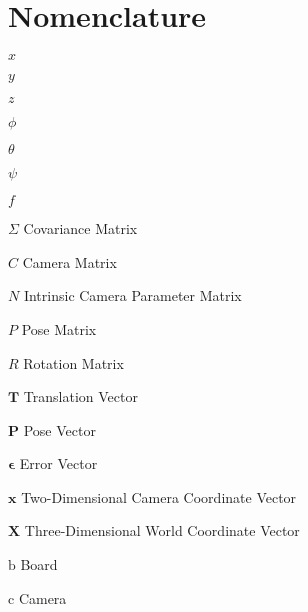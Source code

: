 \chapter{Nomenclature}

\begin{Nomencl}[2cm]

   \item[$x$]         
   \item[$y$]         
   \item[$z$]         
   \item[$\phi$]      
   \item[$\theta$]    
   \item[$\psi$]      \\
   \item[$f$]	      

   \item[$\Sigma$] 	Covariance Matrix
   \item[$C$]		Camera Matrix
   \item[$N$]		Intrinsic Camera Parameter Matrix
   \item[$P$]		Pose Matrix
   \item[$R$]		Rotation Matrix
   \item[$\bm{T}$]	Translation Vector
   \item[$\bm{P}$]	Pose Vector
   \item[$\bm{\epsilon}$]	Error Vector
   \item[$\bm{x}$]	Two-Dimensional Camera Coordinate Vector
   \item[$\bm{X}$]	Three-Dimensional World Coordinate Vector

   \item[$\mathrm{b}$]          Board
   \item[$\mathrm{c}$] 		Camera


\end{Nomencl}
